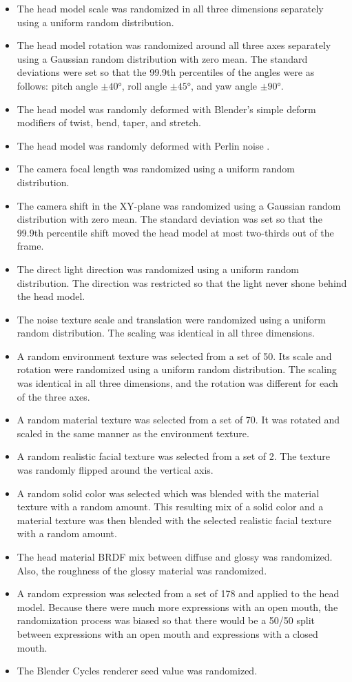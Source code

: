 \begin{itemize}
    \item The head model scale was randomized in all three dimensions separately using a uniform random distribution.
    \item The head model rotation was randomized around all three axes separately using a Gaussian random distribution with zero mean. The standard deviations were set so that the 99.9th percentiles of the angles were as follows: pitch angle $\pm\ang{40}$, roll angle $\pm\ang{45}$, and yaw angle $\pm\ang{90}$.
    \item The head model was randomly deformed with Blender's simple deform modifiers of twist, bend, taper, and stretch.
    \item The head model was randomly deformed with Perlin noise \cite{Perlin2002}.
    \item The camera focal length was randomized using a uniform random distribution.
    \item The camera shift in the XY-plane was randomized using a Gaussian random distribution with zero mean. The standard deviation was set so that the 99.9th percentile shift moved the head model at most two-thirds out of the frame.
    \item The direct light direction was randomized using a uniform random distribution. The direction was restricted so that the light never shone behind the head model.
    \item The noise texture scale and translation were randomized using a uniform random distribution. The scaling was identical in all three dimensions.
    \item A random environment texture was selected from a set of 50. Its scale and rotation were randomized using a uniform random distribution. The scaling was identical in all three dimensions, and the rotation was different for each of the three axes.
    \item A random material texture was selected from a set of 70. It was rotated and scaled in the same manner as the environment texture.
    \item A random realistic facial texture was selected from a set of 2. The texture was randomly flipped around the vertical axis.
    \item A random solid color was selected which was blended with the material texture with a random amount. This resulting mix of a solid color and a material texture was then blended with the selected realistic facial texture with a random amount.
    \item The head material \ac{BRDF} mix between diffuse and glossy was randomized. Also, the roughness of the glossy material was randomized.
    \item A random expression was selected from a set of 178 and applied to the head model. Because there were much more expressions with an open mouth, the randomization process was biased so that there would be a 50/50 split between expressions with an open mouth and expressions with a closed mouth.
    \item The Blender Cycles renderer seed value was randomized.
\end{itemize}

